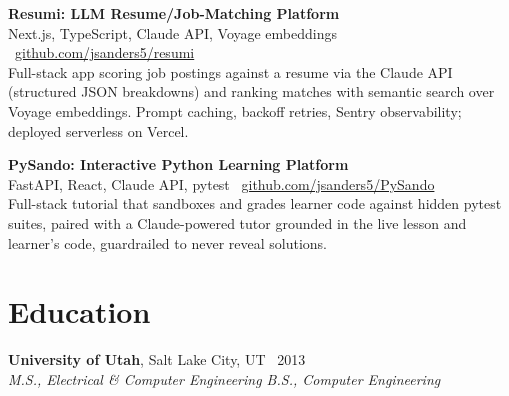 \documentclass[10.5pt, letterpaper]{article}
\newcommand{\jobentry}[4]{%
  \noindent
  \textbf{\color{accent}#1}\textcolor{muted}{, #2 \textbullet\ #4}\\
  \textit{#3}%
}
\begin{document}
\vspace{2pt}

\noindent\textbf{Resumi: LLM Resume/Job-Matching Platform}\\
\textcolor{muted}{\small Next.js, TypeScript, Claude API, Voyage embeddings \textbullet\
\href{https://github.com/jsanders5/resumi}{github.com/jsanders5/resumi}}\\
Full-stack app scoring job postings against a resume via the Claude API
(structured JSON breakdowns) and ranking matches with semantic search over
Voyage embeddings. Prompt caching, backoff retries, Sentry observability;
deployed serverless on Vercel.

\vspace{2pt}

\noindent\textbf{PySando: Interactive Python Learning Platform}\\
\textcolor{muted}{\small FastAPI, React, Claude API, pytest \textbullet\
\href{https://github.com/jsanders5/PySando}{github.com/jsanders5/PySando}}\\
Full-stack tutorial that sandboxes and grades learner code against hidden
pytest suites, paired with a Claude-powered tutor grounded in the live lesson
and learner's code, guardrailed to never reveal solutions.

\section{Education}

\jobentry{University of Utah}{Salt Lake City, UT}%
  {M.S., Electrical \& Computer Engineering \enspace\textbullet\enspace B.S., Computer Engineering}{2013}
\end{document}
